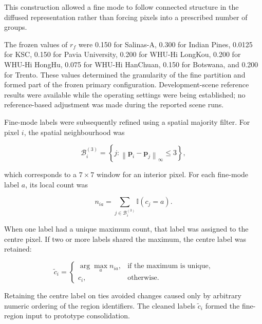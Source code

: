 \documentclass[10pt,a4paper,fleqn]{article}
\begin{document}
This construction allowed a fine mode to follow connected structure in the
diffused representation rather than forcing pixels into a prescribed number
of groups.

The frozen values of \(r_f\) were 0.150 for Salinas-A, 0.300 for Indian Pines,
0.0125 for KSC, 0.150 for Pavia University, 0.200 for WHU-Hi LongKou,
0.200 for WHU-Hi HongHu, 0.075 for WHU-Hi HanChuan, 0.150 for Botswana,
and 0.200 for Trento. These values determined the granularity of the fine partition and formed part
of the frozen primary configuration. Development-scene reference results were
available while the operating settings were being established; no
reference-based adjustment was made during the reported scene runs.

Fine-mode labels were subsequently refined using a spatial majority filter.
For pixel \(i\), the spatial neighbourhood was

\begin{equation}
\mathcal{B}^{(3)}_i
=
\left\{
j:
\left\|
\mathbf{p}_i-\mathbf{p}_j
\right\|_{\infty}
\leq 3
\right\},
\label{eq:cleanup_neighbourhood}
\end{equation}

which corresponds to a \(7\times7\) window for an interior pixel. For each
fine-mode label \(a\), its local count was

\begin{equation}
n_{ia}
=
\sum_{j\in\mathcal{B}^{(3)}_i}
\mathbb{I}
\left(
c_j=a
\right).
\label{eq:local_label_count}
\end{equation}

When one label had a unique maximum count, that label was assigned to the
centre pixel. If two or more labels shared the maximum, the centre label was
retained:

\begin{equation}
\widetilde{c}_i
=
\begin{cases}
\displaystyle
\arg\max_a n_{ia},
&
\text{if the maximum is unique},
\\[6pt]
c_i,
&
\text{otherwise}.
\end{cases}
\label{eq:majority_cleanup}
\end{equation}

Retaining the centre label on ties avoided changes caused only by arbitrary
numeric ordering of the region identifiers. The cleaned labels
\(\widetilde{c}_i\) formed the fine-region input to prototype consolidation.

\end{document}
